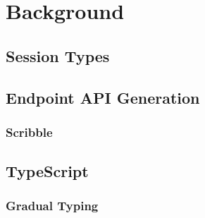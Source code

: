 \chapter{Background}

\section{Session Types}

\section{Endpoint API Generation}

\subsection{Scribble}

\section{TypeScript}

\subsection{Gradual Typing}

\clearpage